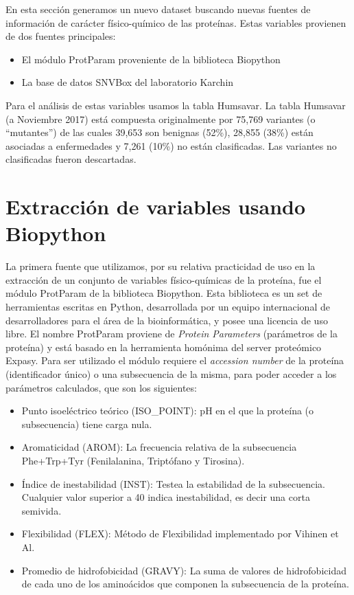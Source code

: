 
En esta sección generamos un nuevo dataset buscando nuevas fuentes de información de carácter físico-químico de las proteínas. Estas variables provienen de dos fuentes principales:

\begin{itemize}
    \item El módulo ProtParam proveniente de la biblioteca Biopython \cite{Chapman:2000:BPT:360262.360268}
    \item La base de datos SNVBox del laboratorio Karchin \cite{Wong2011}
\end{itemize}

Para el análisis de estas variables usamos la tabla Humsavar. La tabla Humsavar (a Noviembre 2017) está compuesta originalmente por 75,769 variantes (o ``mutantes'') de las cuales 39,653 son benignas (52\%), 28,855 (38\%) están asociadas a enfermedades y 7,261 (10\%) no están clasificadas. Las variantes no clasificadas fueron descartadas. 

\section{Extracción de variables usando Biopython}

La primera fuente que utilizamos, por su relativa practicidad de uso en la extracción de un conjunto de variables físico-químicas de la proteína, fue el módulo ProtParam de la biblioteca Biopython. Esta biblioteca es un set de herramientas escritas en Python, desarrollada por un equipo internacional de desarrolladores para el área de la bioinformática, y posee una licencia de uso libre.
El nombre ProtParam proviene de \textit{Protein Parameters} (parámetros de la proteína) y está basado en la herramienta homónima del server proteómico Expasy. Para ser utilizado el módulo requiere el \textit{accession number} de la proteína (identificador único) o una subsecuencia de la misma, para poder acceder a los parámetros calculados, que son los siguientes:

\begin{itemize}
    \item Punto isoeléctrico teórico (ISO\_POINT): pH en el que la proteína (o subsecuencia) tiene carga nula. 
    \item Aromaticidad (AROM): La frecuencia relativa de la subsecuencia Phe+Trp+Tyr (Fenilalanina, Triptófano y Tirosina). 
    \item Índice de inestabilidad (INST): Testea la estabilidad de la subsecuencia. Cualquier valor superior a 40 indica inestabilidad, es decir una corta semivida.
    \item Flexibilidad (FLEX): Método de Flexibilidad implementado por Vihinen et Al.  
    \item Promedio de hidrofobicidad (GRAVY): La suma de valores de hidrofobicidad de cada uno de los aminoácidos que componen la subsecuencia de la proteína.
\end{itemize}

